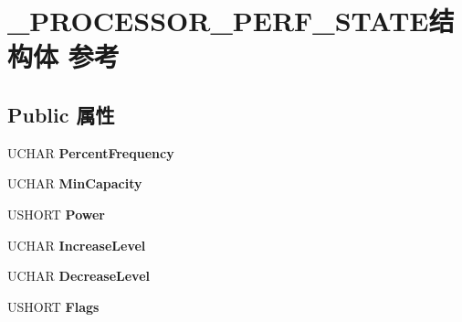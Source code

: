 \hypertarget{struct___p_r_o_c_e_s_s_o_r___p_e_r_f___s_t_a_t_e}{}\section{\+\_\+\+P\+R\+O\+C\+E\+S\+S\+O\+R\+\_\+\+P\+E\+R\+F\+\_\+\+S\+T\+A\+T\+E结构体 参考}
\label{struct___p_r_o_c_e_s_s_o_r___p_e_r_f___s_t_a_t_e}
\subsection*{Public 属性}
\begin{DoxyCompactItemize}
\item 
\mbox{\label{struct___p_r_o_c_e_s_s_o_r___p_e_r_f___s_t_a_t_e_a5319dbd917b70144f119859dd0900ae0}} 
U\+C\+H\+AR {\bfseries Percent\+Frequency}
\item 
\mbox{\label{struct___p_r_o_c_e_s_s_o_r___p_e_r_f___s_t_a_t_e_a18ca3a9240ed97d910b310de2356437b}} 
U\+C\+H\+AR {\bfseries Min\+Capacity}
\item 
\mbox{\label{struct___p_r_o_c_e_s_s_o_r___p_e_r_f___s_t_a_t_e_a9bf098b7dbb573d0a4a0194034191a33}} 
U\+S\+H\+O\+RT {\bfseries Power}
\item 
\mbox{\label{struct___p_r_o_c_e_s_s_o_r___p_e_r_f___s_t_a_t_e_a70876283bd993fcc4c4bcf555de5a769}} 
U\+C\+H\+AR {\bfseries Increase\+Level}
\item 
\mbox{\label{struct___p_r_o_c_e_s_s_o_r___p_e_r_f___s_t_a_t_e_ad9a84c169755275ca1917ee37cc8aaf5}} 
U\+C\+H\+AR {\bfseries Decrease\+Level}
\item 
\mbox{\label{struct___p_r_o_c_e_s_s_o_r___p_e_r_f___s_t_a_t_e_af8f7a2e8c2ec0cd95c92733eae039ea1}} 
U\+S\+H\+O\+RT {\bfseries Flags}
\item 
\mbox{\label{struct___p_r_o_c_e_s_s_o_r___p_e_r_f___s_t_a_t_e_a8adee5d5a498f05208a259be6eec2bc3}} 

\end{DoxyCompactItemize}

